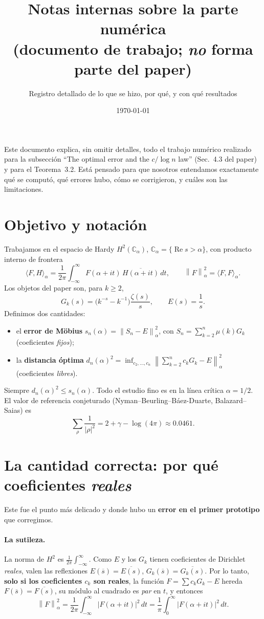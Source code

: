 \documentclass[11pt]{article}
\title{Notas internas sobre la parte num\'erica\\
\large (documento de trabajo; \emph{no} forma parte del paper)}
\author{Registro detallado de lo que se hizo, por qu\'e, y con qu\'e resultados}
\date{\today}
\newcommand{\C}{\mathbb{C}}
\newcommand{\Reop}{\operatorname{Re}}
\newcommand{\norm}[1]{\left\|#1\right\|}
\begin{document}
\maketitle

\noindent
Este documento explica, sin omitir detalles, todo el trabajo num\'erico realizado para
la subsecci\'on ``The optimal error and the $c/\log n$ law'' (Sec.~4.3 del paper) y para
el Teorema~3.2. Est\'a pensado para que nosotros entendamos exactamente qu\'e se
comput\'o, qu\'e errores hubo, c\'omo se corrigieron, y cu\'ales son las limitaciones.

\tableofcontents

\section{Objetivo y notaci\'on}

Trabajamos en el espacio de Hardy $H^2(\C_\alpha)$, $\C_\alpha=\{\Reop s>\alpha\}$, con
producto interno de frontera
\[
\langle F,H\rangle_\alpha=\frac1{2\pi}\int_{-\infty}^{\infty}F(\alpha+it)\,\overline{H(\alpha+it)}\,dt,
\qquad \norm{F}_\alpha^2=\langle F,F\rangle_\alpha .
\]
Los objetos del paper son, para $k\ge2$,
\[
G_k(s)=\bigl(k^{-s}-k^{-1}\bigr)\frac{\zeta(s)}{s},\qquad E(s)=\frac1s .
\]
Definimos dos cantidades:
\begin{itemize}[leftmargin=*]
  \item el \textbf{error de M\"obius} $s_n(\alpha)=\norm{S_n-E}_\alpha^2$, con
        $S_n=\sum_{k=2}^n\mu(k)G_k$ (coeficientes \emph{fijos});
  \item la \textbf{distancia \'optima}
        $d_n(\alpha)^2=\inf_{c_2,\dots,c_n}\norm{\sum_{k=2}^n c_kG_k-E}_\alpha^2$
        (coeficientes \emph{libres}).
\end{itemize}
Siempre $d_n(\alpha)^2\le s_n(\alpha)$. Todo el estudio fino es en la l\'inea cr\'itica
$\alpha=1/2$. El valor de referencia conjeturado (Nyman--Beurling--B\'aez-Duarte,
Balazard--Saias) es
\[
\sum_{\rho}\frac1{|\rho|^2}=2+\gamma-\log(4\pi)\approx0.0461 .
\]

\section{La cantidad correcta: por qu\'e coeficientes \emph{reales}}
\label{sec:bug}

Este fue el punto m\'as delicado y donde hubo un \textbf{error en el primer prototipo}
que corregimos.

\paragraph{La sutileza.} La norma de $H^2$ es $\frac1{2\pi}\int_{-\infty}^{\infty}$.
Como $E$ y los $G_k$ tienen coeficientes de Dirichlet \emph{reales}, valen las
reflexiones $E(\overline s)=\overline{E(s)}$, $G_k(\overline s)=\overline{G_k(s)}$.
Por lo tanto, \textbf{solo si los coeficientes $c_k$ son reales}, la funci\'on
$F=\sum c_kG_k-E$ hereda $F(\overline s)=\overline{F(s)}$, su m\'odulo al cuadrado es
\emph{par} en $t$, y entonces
\[
\norm{F}_\alpha^2=\frac1{2\pi}\int_{-\infty}^{\infty}|F(\alpha+it)|^2\,dt
=\frac1{\pi}\int_{0}^{\infty}|F(\alpha+it)|^2\,dt .
\]
\end{document}
